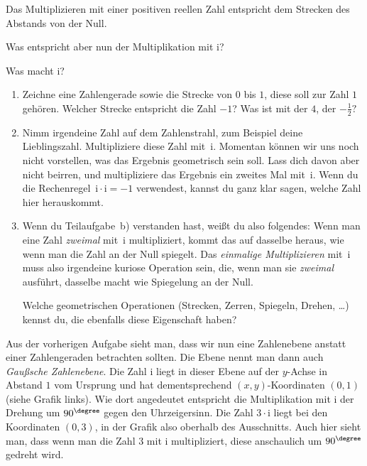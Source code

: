 \documentclass{zirkelblatt1415}
\newcommand{\ii}{\mathrm{i}}
\begin{document}
Das Multiplizieren mit einer positiven reellen Zahl entspricht dem Strecken des Abstands von der Null.

Was entspricht aber nun der Multiplikation mit $\ii$?

\newpage

\begin{aufgabe}{Was macht $\ii$?}
\begin{enumerate}
  \item Zeichne eine Zahlengerade sowie die Strecke von $0$ bis $1$, diese soll zur Zahl $1$ gehören. Welcher Strecke entspricht die Zahl $-1$? Was ist mit der $4$, der $-\frac{1}{2}?$
  \item Nimm irgendeine Zahl auf dem Zahlenstrahl, zum Beispiel deine Lieblingszahl. Multipliziere diese Zahl mit~$\ii$. Momentan können wir uns noch nicht vorstellen, was das Ergebnis geometrisch sein soll. Lass dich davon aber nicht beirren, und multipliziere das Ergebnis ein zweites Mal mit~$\ii$. Wenn du die Rechenregel~$\ii \cdot \ii = -1$ verwendest, kannst du ganz klar sagen, welche Zahl hier herauskommt.
  \item Wenn du Teilaufgabe~b) verstanden hast, weißt du also folgendes: Wenn man eine Zahl \emph{zweimal} mit~$\ii$ multipliziert, kommt das auf dasselbe heraus, wie wenn man die Zahl an der Null spiegelt. Das \emph{einmalige Multiplizieren} mit~$\ii$ muss also irgendeine kuriose Operation sein, die, wenn man sie \emph{zweimal} ausführt, dasselbe macht wie Spiegelung an der Null.

Welche geometrischen Operationen (Strecken, Zerren, Spiegeln, Drehen, \ldots) kennst du, die ebenfalls diese Eigenschaft haben?
\end{enumerate}
\end{aufgabe}

Aus der vorherigen Aufgabe sieht man, dass wir nun eine Zahlenebene anstatt einer Zahlengeraden betrachten sollten. Die Ebene nennt man dann auch \emph{Gaußsche Zahlenebene}. Die Zahl $\ii$ liegt in dieser Ebene auf der $y$-Achse in Abstand $1$ vom Ursprung und hat dementsprechend $(x,y)$-Koordinaten $(0,1)$ (siehe Grafik links). Wie dort angedeutet entspricht die Multiplikation mit $\ii$ der Drehung um $90^{\degree}$ gegen den Uhrzeigersinn. Die Zahl $3\cdot\ii$ liegt bei den Koordinaten $(0,3)$, in der Grafik also oberhalb des Ausschnitts. Auch hier sieht man, dass wenn man die Zahl $3$ mit $\ii$ multipliziert, diese anschaulich um $90^{\degree}$ gedreht wird.
\end{document}
